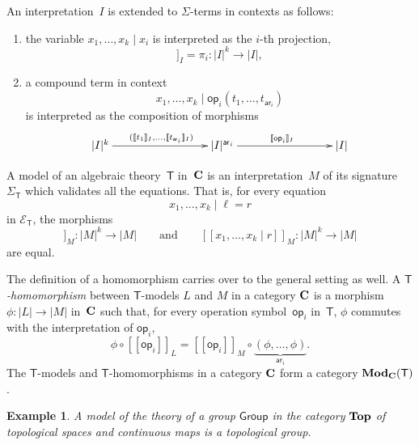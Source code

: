 \documentclass{amsart}
\newcommand{\theory}[1]{\mathsf{#1}} %
\newcommand{\signature}[1]{\Sigma_{\theory{#1}}} %
\newcommand{\equations}[1]{\mathcal{E}_{\theory{#1}}} %
\newcommand{\ModC}[2]{\text{\textbf{Mod}}_{#1}(\theory{#2})} %
\newcommand{\category}[1]{\text{\textbf{#1}}} %
\newcommand{\carrier}[1]{|#1|} %
\newcommand{\op}[1]{\mathsf{op}_{#1}} %
\newcommand{\arity}[1]{\mathsf{ar}_{#1}} %
\newcommand{\sem}[1]{[\![#1]\!]} %
\newtheorem{example}[definition]{Example}
\begin{document}
An interpretation~$I$ is extended to $\Sigma$-terms in contexts as follows:
%
\begin{enumerate}
\item the variable $x_1, \ldots, x_k \mid x_i$ is interpreted as the $i$-th projection,
  \begin{equation*}
    \sem{x_1, \ldots, x_k \mid  x_i}_I = \pi_i : \carrier{I}^k \to \carrier{I},
  \end{equation*}
\item a compound term in context
  \begin{equation*}
    x_1, \ldots, x_k \mid \op{i}(t_1, \ldots, t_{\arity{i}})
  \end{equation*}
  is interpreted as the composition of morphisms
  \begin{equation*}
    \xymatrix@+6em{
      {\carrier{I}^k} \ar[r]^{(\sem{t_1}_I, \ldots, \sem{t_{\arity{i}}}_I)}
      &
      {\carrier{I}^{\arity{i}}} \ar[r]^{\sem{\op{i}}_I}
      &
      {\carrier{I}}
    }
  \end{equation*}
\end{enumerate}
%
A model of an algebraic theory~$\theory{T}$ in~$\category{C}$ is an interpretation~$M$ of
its signature $\signature{T}$ which validates all the equations. That is, for every
equation
%
\begin{equation*}
  x_1, \ldots, x_k \mid \ell = r
\end{equation*}
%
in $\equations{T}$, the morphisms
%
\begin{equation*}
  \sem{x_1, \ldots, x_k \mid \ell}_M : \carrier{M}^k \to \carrier{M}
  \qquad\text{and}\qquad
  \sem{x_1, \ldots, x_k \mid r}_M : \carrier{M}^k \to \carrier{M}
\end{equation*}
%
are equal.

The definition of a homomorphism carries over to the general setting as well. A
\emph{$\theory{T}$-homomorphism} between $\theory{T}$-models $L$ and $M$ in a category
$\category{C}$ is a morphism $\phi : \carrier{L} \to \carrier{M}$ in~$\category{C}$ such that, for every
operation symbol~$\op{i}$ in~$\theory{T}$, $\phi$ commutes with the interpretation of
$\op{i}$,
%
\begin{equation*}
  \phi \circ \sem{\op{i}}_L = \sem{\op{i}}_M \circ \underbrace{(\phi, \ldots, \phi)}_{\arity{i}}.
\end{equation*}
%
The $\theory{T}$-models and $\theory{T}$-homomorphisms in a category $\category{C}$ form a
category $\ModC{\category{C}}{T}$.

\begin{example}
  A model of the theory of a group $\theory{Group}$ in the category $\category{Top}$ of
  topological spaces and continuous maps is a topological group.
\end{example}
\end{document}
